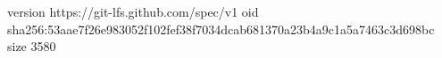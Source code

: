 version https://git-lfs.github.com/spec/v1
oid sha256:53aae7f26e983052f102fef38f7034dcab681370a23b4a9c1a5a7463c3d698bc
size 3580
